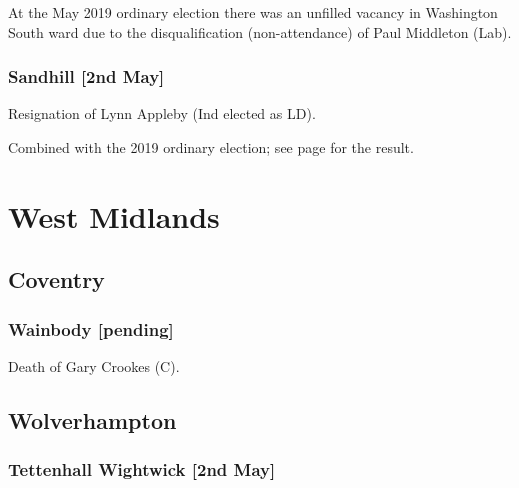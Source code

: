 \documentclass[a4paper,openany]{book}
\begin{document}
\begin{resultsiii}
At the May 2019 ordinary election there was an unfilled vacancy in Washington South ward due to the disqualification (non-attendance) of Paul Middleton (Lab).

\subsubsection*{Sandhill \hspace*{\fill}\nolinebreak[1]%
	\enspace\hspace*{\fill}
	[2nd May]}


Resignation of Lynn Appleby (Ind elected as LD).

Combined with the 2019 ordinary election; see page \pageref{SandhillSunderland} for the result.

\section{West Midlands}

\subsection*{Coventry}

\subsubsection*{Wainbody \hspace*{\fill}\nolinebreak[1]%
	\enspace\hspace*{\fill}
	[pending]}


Death of Gary Crookes (C).

\subsection*{Wolverhampton}

\subsubsection*{Tettenhall Wightwick \hspace*{\fill}\nolinebreak[1]%
	\enspace\hspace*{\fill}
	[2nd May]}


\end{resultsiii}
\end{document}
